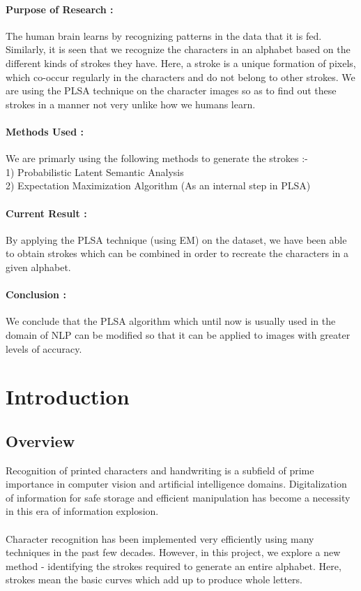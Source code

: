 \documentclass[10pt]{article}
\begin{document}
		\paragraph{Purpose of Research :}
		The human brain learns by recognizing patterns in the data that it is fed. Similarly, it is seen that we recognize the characters in an alphabet based on the different kinds of strokes they have. Here, a stroke is a unique formation of pixels, which co-occur regularly in the characters and do not belong to other strokes. We are using the PLSA technique on the character images so as to find out these strokes in a manner not very unlike how we humans learn.
		\paragraph{Methods Used :}
		We are primarly using the following methods to generate the strokes :- \\
		1) Probabilistic Latent Semantic Analysis\\2) Expectation Maximization Algorithm (As an internal step in PLSA)	
		\paragraph{Current Result :}
		By applying the PLSA technique (using EM) on the dataset, we have been able to obtain strokes which can be combined in order to recreate the characters in a given alphabet.
		\paragraph{Conclusion :}
		We conclude that the PLSA algorithm which until now is usually used in the domain of NLP can be modified so that it can be applied to images with greater levels of accuracy.
	\newpage
	\section{Introduction}
		\hrulefill
		\subsection{Overview}
			Recognition of printed characters and handwriting is a subfield of prime importance in computer vision and artificial intelligence domains. Digitalization of information for safe storage and efficient manipulation has become a necessity in this era of information explosion.\\\\
			Character recognition has been implemented very efficiently using many techniques in the past few decades. However, in this project, we explore a new method - identifying the strokes required to generate an entire alphabet. Here, strokes mean the basic curves which add up to produce whole letters. 
			
\end{document}
